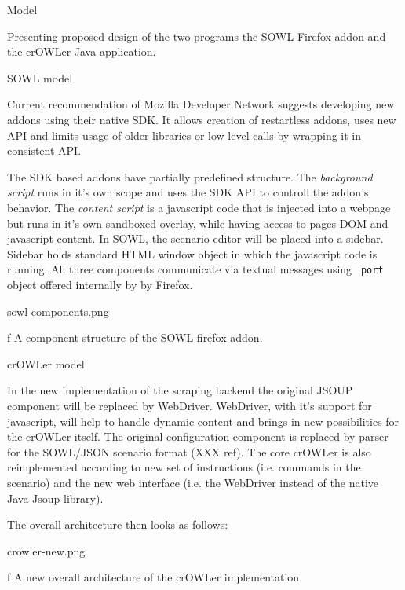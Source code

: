 \sec Model

Presenting proposed design of the two programs the SOWL Firefox addon and the
crOWLer Java application. 

\secc SOWL model

Current recommendation of Mozilla Developer Network suggests developing new
addons using their native SDK. It allows creation of restartless addons, uses 
new API and limits usage of older libraries or low level calls by wrapping it 
in consistent API. 

The SDK based addons have partially predefined structure. The {\em background script}
runs in it's own scope and uses the SDK API to controll the addon's behavior.
The {\em content script} is a javascript code that is injected into a webpage
but runs in it's own sandboxed overlay, while having access to pages DOM and
javascript content. In SOWL, the scenario editor will be placed into a sidebar.
Sidebar holds standard HTML window object in which the javascript code is
running.  All three components communicate via textual messages using {\tt
port} object offered internally by by Firefox. 

\midinsert
\picw=12.5cm \cinspic sowl-components.png
\caption/f A component structure of the SOWL firefox addon. 
\endinsert


\secc crOWLer model

In the new implementation of the scraping backend the original JSOUP component
will be replaced by WebDriver. WebDriver, with it's support for javascript,
will help to handle dynamic content and brings in new possibilities for the
crOWLer itself. The original configuration component is replaced by parser for
the SOWL/JSON scenario format (XXX ref).  The core crOWLer is also
reimplemented according to new set of instructions (i.e. commands in the
scenario) and the new web interface (i.e. the WebDriver instead of the native
Java Jsoup library). 

The overall architecture then looks as follows: 

\midinsert
\picw=7.5cm \cinspic crowler-new.png
\caption/f A new overall architecture of the crOWLer implementation. 
\endinsert



%





